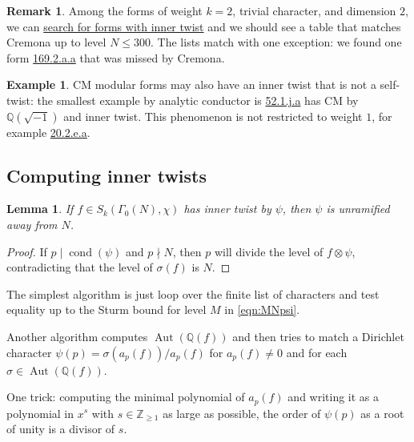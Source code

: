 \documentclass[11pt]{amsart}
\numberwithin{equation}{subsection}
\theoremstyle{plain}
\newtheorem{lem}[equation]{Lemma}
\theoremstyle{definition}
\newtheorem{rmk}[equation]{Remark}
\newtheorem{exm}[equation]{Example}
\newcommand{\Q}{\mathbb{Q}}
\newcommand{\Z}{\mathbb{Z}}
\DeclareMathOperator{\Aut}{Aut}
\DeclareMathOperator{\cond}{cond}
\begin{document}
\begin{rmk}
Among the forms of weight $k=2$, trivial character, and dimension $2$, we can \href{http://cmfs.lmfdb.xyz/ModularForm/GL2/Q/holomorphic/?weight=2&char_order=1&dim=2&has_inner_twist=yes&count=50&search_type=List}{search for forms with inner twist} and we should see a table that matches Cremona \cite[Table 3]{Cremona:abextratwist} up to level $N \leq 300$.  The lists match with one exception: we found one form \href{http://cmfs.lmfdb.xyz/ModularForm/GL2/Q/holomorphic/169/2/a/a/}{\textsf{169.2.a.a}} that was missed by Cremona.
\end{rmk}

\begin{exm}
CM modular forms may also have an inner twist that is not a self-twist: the smallest example by analytic conductor is \href{http://cmfs.lmfdb.xyz/ModularForm/GL2/Q/holomorphic/52/1/j/a/}{\textsf{52.1.j.a}} has CM by $\Q(\sqrt{-1})$ and inner twist.  This phenomenon is not restricted to weight $1$, for example \href{http://cmfs.lmfdb.xyz/ModularForm/GL2/Q/holomorphic/20/2/e/a/}{\textsf{20.2.e.a}}.
\end{exm}

\subsection{Computing inner twists}

\begin{lem}
If $f \in S_k(\Gamma_0(N),\chi)$ has inner twist by $\psi$, then $\psi$ is unramified away from $N$.  
\end{lem}

\begin{proof}
If $p \mid \cond(\psi)$ and $p \nmid N$, then $p$ will divide the level of $f \otimes \psi$, contradicting that the level of $\sigma(f)$ is $N$. 
\end{proof}

The simplest algorithm is just loop over the finite list of characters and test equality up to the Sturm bound for level $M$ in \eqref{eqn:MNpsi}.  

Another algorithm computes $\Aut(\Q(f))$ and then tries to match a Dirichlet character $\psi(p)=\sigma(a_p(f))/a_p(f)$ for $a_p(f) \neq 0$ and for each $\sigma \in \Aut(\Q(f))$.  

One trick: computing the minimal polynomial of $a_p(f)$ and writing it as a polynomial in $x^s$ with $s \in \Z_{\geq 1}$ as large as possible, the order of $\psi(p)$ as a root of unity is a divisor of $s$.  
\end{document}
